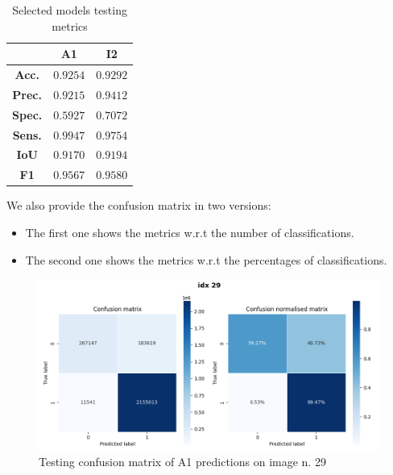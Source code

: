 \begin{table}[H]
\centering
\begin{tabular}{|c|c|c|}
\hline
& \textbf{A1} & \textbf{I2}
\\ \hline \hline
\textbf{Acc.} & \textcolor{myred}{$0.9254$} & \textcolor{mygreen}{$0.9292$}
\\ \hline
\textbf{Prec.} & \textcolor{myred}{$0.9215$} & \textcolor{mygreen}{$0.9412$}
\\ \hline
\textbf{Spec.} & \textcolor{myred}{$0.5927$} & \textcolor{mygreen}{$0.7072$}
\\ \hline
\textbf{Sens.} & \textcolor{mygreen}{$0.9947$} & \textcolor{myred}{$0.9754$}
\\ \hline
\textbf{IoU} & \textcolor{myred}{$0.9170$} & \textcolor{mygreen}{$0.9194$}
\\ \hline
\textbf{F1} & \textcolor{myred}{$0.9567$} & \textcolor{mygreen}{$0.9580$}
\\ \hline
\end{tabular}
\caption{Selected models testing metrics}
\end{table}

We also provide the confusion matrix in two versions:
\begin{itemize}
    \item The first one shows the metrics w.r.t the number of classifications.
    \item The second one shows the metrics w.r.t the percentages of classifications.
\end{itemize}

\begin{figure}[H]
 \centering
 \includegraphics[scale=0.6, cframe=bluepoli 2pt]{./resources/A1_conf_matr_29.png}
 \caption[A1 test confusion matrix]
    {Testing confusion matrix of A1 predictions on image n. 29}
\end{figure}

